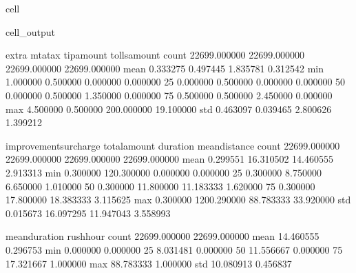 \documentclass[letterpaper,10pt,english]{sphinxmanual}
\begin{document}
\begin{sphinxuseclass}{cell}
\begin{sphinxuseclass}{cell_output}
\begin{sphinxVerbatim}[commandchars=\\\{\}]
              extra       mta\PYGZus{}tax    tip\PYGZus{}amount  tolls\PYGZus{}amount  \PYGZbs{}
count  22699.000000  22699.000000  22699.000000  22699.000000   
mean       0.333275      0.497445      1.835781      0.312542   
min       \PYGZhy{}1.000000     \PYGZhy{}0.500000      0.000000      0.000000   
25\PYGZpc{}        0.000000      0.500000      0.000000      0.000000   
50\PYGZpc{}        0.000000      0.500000      1.350000      0.000000   
75\PYGZpc{}        0.500000      0.500000      2.450000      0.000000   
max        4.500000      0.500000    200.000000     19.100000   
std        0.463097      0.039465      2.800626      1.399212   

       improvement\PYGZus{}surcharge  total\PYGZus{}amount      duration  mean\PYGZus{}distance  \PYGZbs{}
count           22699.000000  22699.000000  22699.000000   22699.000000   
mean                0.299551     16.310502     14.460555       2.913313   
min                \PYGZhy{}0.300000   \PYGZhy{}120.300000      0.000000       0.000000   
25\PYGZpc{}                 0.300000      8.750000      6.650000       1.010000   
50\PYGZpc{}                 0.300000     11.800000     11.183333       1.620000   
75\PYGZpc{}                 0.300000     17.800000     18.383333       3.115625   
max                 0.300000   1200.290000     88.783333      33.920000   
std                 0.015673     16.097295     11.947043       3.558993   

       mean\PYGZus{}duration     rush\PYGZus{}hour  
count   22699.000000  22699.000000  
mean       14.460555      0.296753  
min         0.000000      0.000000  
25\PYGZpc{}         8.031481      0.000000  
50\PYGZpc{}        11.556667      0.000000  
75\PYGZpc{}        17.321667      1.000000  
max        88.783333      1.000000  
std        10.080913      0.456837  
\end{sphinxVerbatim}

\end{sphinxuseclass}
\end{sphinxuseclass}
\end{document}
